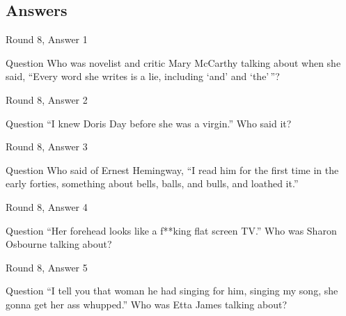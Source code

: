 \documentclass[11pt]{beamer}
\begin{document}
\subsection{Answers}
\begin{frame}[t]{Round 8, Answer 1}
\begin{block}{Question}
Who was novelist and critic Mary McCarthy talking about when she said, ``Every word she writes is a lie, including `and' and `the'\,''?
\end{block}
\end{frame}
\begin{frame}[t]{Round 8, Answer 2}
\begin{block}{Question}
``I knew Doris Day before she was a virgin.'' Who said it?
\end{block}
\end{frame}
\begin{frame}[t]{Round 8, Answer 3}
\begin{block}{Question}
Who said of Ernest Hemingway, ``I read him for the first time in the early forties, something about bells, balls, and bulls, and loathed it.''
\end{block}
\end{frame}
\begin{frame}[t]{Round 8, Answer 4}
\begin{block}{Question}
``Her forehead looks like a f**king flat screen TV.'' Who was Sharon Osbourne talking about?
\end{block}
\end{frame}
\begin{frame}[t]{Round 8, Answer 5}
\begin{block}{Question}
``I tell you that woman he had singing for him, singing my song, she gonna get her ass whupped.'' Who was Etta James talking about?
\end{block}
\end{frame}
\end{document}

